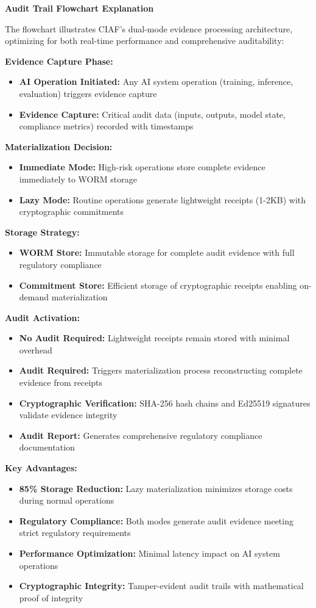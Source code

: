 \documentclass[12pt,a4paper]{article}
\begin{document}
\begin{technicalbox}
\textbf{Audit Trail Flowchart Explanation}

The flowchart illustrates CIAF's dual-mode evidence processing architecture, optimizing for both real-time performance and comprehensive auditability:

\textbf{Evidence Capture Phase:}
\begin{itemize}
\item \textbf{AI Operation Initiated:} Any AI system operation (training, inference, evaluation) triggers evidence capture
\item \textbf{Evidence Capture:} Critical audit data (inputs, outputs, model state, compliance metrics) recorded with timestamps
\end{itemize}

\textbf{Materialization Decision:}
\begin{itemize}
\item \textbf{Immediate Mode:} High-risk operations store complete evidence immediately to WORM storage
\item \textbf{Lazy Mode:} Routine operations generate lightweight receipts (1-2KB) with cryptographic commitments
\end{itemize}

\textbf{Storage Strategy:}
\begin{itemize}
\item \textbf{WORM Store:} Immutable storage for complete audit evidence with full regulatory compliance
\item \textbf{Commitment Store:} Efficient storage of cryptographic receipts enabling on-demand materialization
\end{itemize}

\textbf{Audit Activation:}
\begin{itemize}
\item \textbf{No Audit Required:} Lightweight receipts remain stored with minimal overhead
\item \textbf{Audit Required:} Triggers materialization process reconstructing complete evidence from receipts
\item \textbf{Cryptographic Verification:} SHA-256 hash chains and Ed25519 signatures validate evidence integrity
\item \textbf{Audit Report:} Generates comprehensive regulatory compliance documentation
\end{itemize}

\textbf{Key Advantages:}
\begin{itemize}
\item \textbf{85\% Storage Reduction:} Lazy materialization minimizes storage costs during normal operations
\item \textbf{Regulatory Compliance:} Both modes generate audit evidence meeting strict regulatory requirements
\item \textbf{Performance Optimization:} Minimal latency impact on AI system operations
\item \textbf{Cryptographic Integrity:} Tamper-evident audit trails with mathematical proof of integrity
\end{itemize}
\end{technicalbox}
\end{document}
